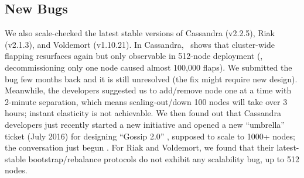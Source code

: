 


\subsection{New Bugs}
\label{eval-new}



We also scale-checked the latest stable versions of Cassandra (v2.2.5),
Riak (v2.1.3), and Voldemort (v1.10.21). 
%
In Cassandra, \sck\ shows that cluster-wide flapping resurfaces again but
only observable in 512-node deployment (\eg, decommissioning only one node
caused almost 100,000 flaps).  We submitted the bug few months back and it
is still unresolved (the fix might require new design).
%
Meanwhile, the developers suggested us to add/remove node one at a time
with 2-minute separation, which means scaling-out/down 100 nodes will take
over 3 hours; instant elasticity is not achievable.
%
We then found out that Cassandra developers just recently started a new
initiative and opened a new ``umbrella'' ticket (July 2016) for designing
``Gossip 2.0'' \cite{Gossip20}, supposed to scale to
1000+ nodes; the conversation just begun \cite{Gossip20Mail}.
%
%
For Riak and Voldemort, we found that their latest-stable
bootstrap/rebalance protocols do not exhibit any scalability bug, up to
512 nodes.



\fi


